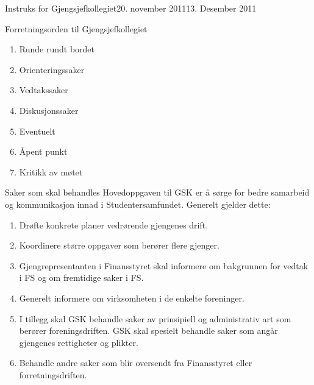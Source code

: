 \documentclass[../fsbok.tex]{subfiles}
\begin{document}
\begin{instruks}{Instruks for Gjengsjefkollegiet}{20. november 2011}{13. Desember 2011}
\begin{instruksledd}{Forretningsorden til Gjengsjefkollegiet}
\begin{enumerate}
\begin{enumerate}
\begin{enumerate}
                            \item Runde rundt bordet
                            \item Orienteringssaker
                            \item Vedtakssaker
                            \item Diskusjonssaker
                            \item Eventuelt
                            \item Åpent punkt
                            \item Kritikk av møtet
                        \end{enumerate}
                \end{enumerate}
        \end{enumerate}
    \end{instruksledd}

    \begin{instruksledd}{Saker som skal behandles}
        Hovedoppgaven til GSK er å sørge for bedre samarbeid og kommunikasjon innad i
        Studentersamfundet. Generelt
        gjelder dette:
        \begin{enumerate}
            \item Drøfte konkrete planer vedrørende gjengenes drift.
            \item Koordinere større oppgaver som berører flere gjenger.
            \item Gjengrepresentanten i Finansstyret skal informere om bakgrunnen for
                vedtak i FS og om fremtidige saker i FS.
            \item Generelt informere om virksomheten i de enkelte foreninger.
            \item I tillegg skal GSK behandle saker av prinsipiell og administrativ art
                som berører foreningsdriften. GSK skal
                spesielt behandle saker som angår gjengenes rettigheter og plikter.
            \item Behandle andre saker som blir oversendt fra Finansstyret eller
                forretningsdriften.
        \end{enumerate}

    \end{instruksledd}
\end{instruks}
\end{document}
